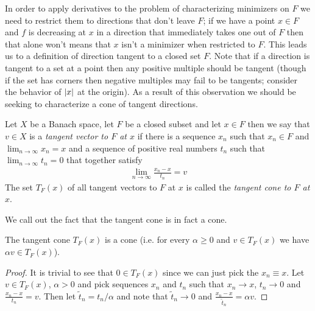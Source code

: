In order
to apply derivatives to the problem of characterizing minimizers on
$F$ we need to restrict them to directions that don't leave $F$;
if we have a point $x \in F$ and $f$ is decreasing at $x$ in a direction that immediately takes one out of
$F$ then that alone won't means that $x$ isn't a minimizer when
restricted to $F$.  This leads us to a definition of direction tangent
to a closed set $F$.  Note that if a direction is tangent to a set at
a point then any positive multiple should be tangent (though if the
set has corners then negative multiples may fail to be tangents;
consider the behavior of $\left \vert x \right \vert$ at the origin).  As a result of
this observation we should be seeking to characterize a cone of
tangent directions.  
\begin{defn}Let $X$ be a Banach space, let $F$ be a closed subset and
  let $x \in F$ then we say that $v \in X$ is a \emph{tangent vector to $F$
  at $x$} if there is a sequence $x_n$ such that $x_n \in F$ and
  $\lim_{n \to \infty} x_n = x$ and a sequence of positive real numbers
  $t_n$ such that $\lim_{n \to \infty} t_n = 0$ that together satisfy
\begin{align*}
\lim_{n \to \infty} \frac{x_n - x}{t_n} = v
\end{align*}
The set $T_F(x)$ of all tangent vectors to $F$ at $x$ is called the
\emph{tangent cone to $F$ at $x$}.
\end{defn}

We call out the fact that the tangent cone is in fact a cone.
\begin{prop}The tangent cone $T_F(x)$ is a cone (i.e. for every
  $\alpha \geq 0$ and $v \in T_F(x)$ we have $\alpha v \in T_F(x)$).
\end{prop}
\begin{proof}
It is trivial to see that $0 \in T_F(x)$ since we can just pick the
$x_n \equiv x$.  Let $v \in T_F(x)$, $\alpha > 0$ and pick sequences $x_n$ and $t_n$ such that $x_n \to x$, $t_n \to 0$ and
$\frac{x_n - x}{t_n} = v$.  Then let $\tilde{t}_n = t_n/\alpha$ and note that
$\tilde{t}_n \to 0$ and $\frac{x_n -x}{\tilde{t}_n} = \alpha v$.
\end{proof}

